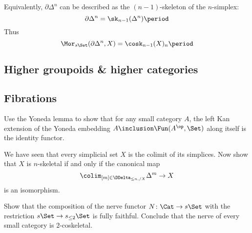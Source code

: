 Equivalently, $\partial \Delta^n$ can be described as the $(n-1)$-skeleton of the $n$-simplex:
\[
  \partial \Delta^n = \sk_{n-1}(\Delta^n) \period
\]
Thus
\[
  \Mor_{s\Set}(\partial\Delta^n, X) = \cosk_{n-1}(X)_n \period
\]

\subsection{Higher groupoids \& higher categories}%
\label{sub:Highergroupoidshighercategories}

\subsection{Fibrations}%
\label{sub:Fibrations}

\begin{exercises}
  \item%
    \label{exercise:stronggeneration}
    Use the Yoneda lemma to show that for any small category $A$,
    the left Kan extension of the Yoneda embedding $A \inclusion \Fun(A^{\op}, \Set)$ along itself is the identity functor.
  \item%
    \label{exercise:nskeletonascolimit}
    We have seen that every simplicial set $X$ is the colimit of its simplices.
    Now show that $X$ is $n$-skeletal if and only if the canonical map
    \[
      \colim_{[m] \in \DDelta_{\leq n, /X}} \Delta^m \to X
    \]
    is an isomorphism.
  \item%
    \label{exercise:nerve2cosk}
    Show that the composition of the nerve functor $N \colon \Cat \to s\Set$ with the restriction $s\Set \to s_{\leq 2}\Set$ is fully faithful.
    Conclude that the nerve of every small category is $2$-coskeletal.
\end{exercises}

